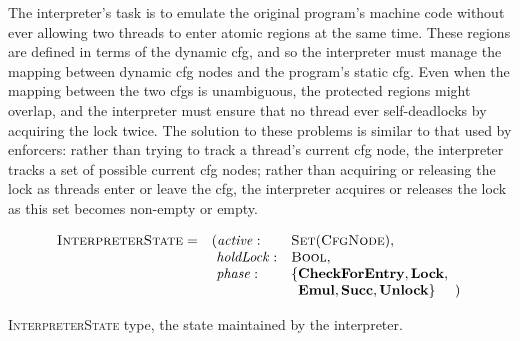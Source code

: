  The interpreter's task is to emulate the original
program's machine code without ever allowing two threads to enter
atomic regions at the same time.  These regions are defined in terms
of the dynamic \gls{cfg}, and so the interpreter must manage the
mapping between dynamic \gls{cfg} nodes and the program's static
\gls{cfg}.  Even when the mapping between the two \glspl{cfg} is
unambiguous, the protected regions might overlap, and the interpreter
must ensure that no thread ever self-deadlocks by acquiring the lock
twice.  The solution to these problems is similar to that used by
enforcers: rather than trying to track a thread's current \gls{cfg}
node, the interpreter tracks a set of possible current \gls{cfg}
nodes; rather than acquiring or releasing the lock as threads enter or
leave the \gls{cfg}, the interpreter acquires or releases the lock as
this set becomes non-empty or empty.

\begin{sanefig}
  \begin{displaymath}
    \begin{array}{llll}
      \textsc{InterpreterState} = & (\mathit{active}: &\textsc{Set}(\textsc{CfgNode}), &\\
      & \,\,\mathit{holdLock}: &\textsc{Bool},\\
      & \,\,\mathit{phase}: & \{\mathbf{CheckForEntry}, \mathbf{Lock}, \\
      &                     & \,\,\,\mathbf{Emul}, \mathbf{Succ}, \mathbf{Unlock}\} &\!\!\!)\\
    \end{array}
  \end{displaymath}
  \caption{\textsc{InterpreterState} type, the state maintained by the
    interpreter.}
  \label{fig:fix_bugs:interpreter_state}
\end{sanefig}

